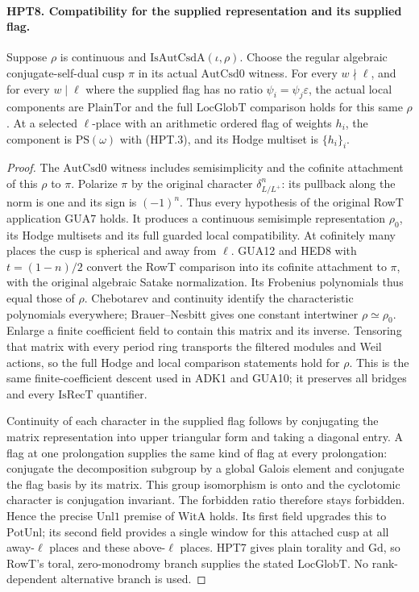 \paragraph{HPT8. Compatibility for the supplied representation and its supplied flag.}
\label{claim:HPT8}
Suppose $\rho$ is continuous and $\mathrm{IsAutCsdA}(\iota,\rho)$.
Choose the regular algebraic conjugate-self-dual cusp $\pi$ in its
actual $\mathrm{AutCsd0}$ witness.  For every $w\nmid\ell$, and
for every $w\mid\ell$ where the supplied flag has no ratio
$\psi_i=\psi_j\varepsilon$, the actual local components are
$\mathrm{PlainTor}$ and the full $\mathrm{LocGlobT}$ comparison
holds for this same $\rho$.  At a selected $\ell$-place with an
arithmetic ordered flag of weights $h_i$, the component is
$\mathrm{PS}(\omega)$ with (HPT.3), and its Hodge multiset is
$\{h_i\}_i$.
\begin{proof}
The $\mathrm{AutCsd0}$ witness includes semisimplicity and the
cofinite attachment of this $\rho$ to $\pi$.  Polarize $\pi$ by
the original character $\delta_{L/L^+}^{n}$: its pullback along
the norm is one and its sign is $(-1)^n$.  Thus every hypothesis
of the original RowT application GUA7 holds.  It produces a
continuous semisimple representation $\rho_0$, its Hodge
multisets and its full guarded local compatibility.
At cofinitely many places the cusp is spherical and away from
$\ell$.  GUA12 and HED8 with $t=(1-n)/2$ convert the RowT
comparison into its cofinite attachment to $\pi$, with the
original algebraic Satake normalization.  Its Frobenius
polynomials thus equal those of $\rho$.  Chebotarev
and continuity identify the characteristic polynomials everywhere;
Brauer--Nesbitt gives one constant intertwiner
$\rho\simeq\rho_0$.  Enlarge a finite coefficient field to contain
this matrix and its inverse.  Tensoring that matrix with every
period ring transports the filtered modules and Weil actions,
so the full Hodge and local comparison statements hold for $\rho$.
This is the same finite-coefficient descent used in ADK1 and GUA10;
it preserves all bridges and every $\mathrm{IsRecT}$ quantifier.

Continuity of each character in the supplied flag follows by
conjugating the matrix representation into upper triangular form
and taking a diagonal entry.  A flag at one prolongation supplies
the same kind of flag at every prolongation: conjugate the
decomposition subgroup by a global Galois element and conjugate
the flag basis by its matrix.  This group isomorphism is onto and
the cyclotomic character is conjugation invariant.  The forbidden
ratio therefore stays forbidden.  Hence the precise $\mathrm{Unl1}$
premise of $\mathrm{WitA}$ holds.  Its first field upgrades this
to $\mathrm{PotUnl}$; its second field provides a single window
for this attached cusp at all away-$\ell$ places and these
above-$\ell$ places.  HPT7 gives plain torality and $\mathrm{Gd}$,
so RowT's toral, zero-monodromy branch supplies the stated
$\mathrm{LocGlobT}$.  No rank-dependent alternative branch is used.


\end{proof}
